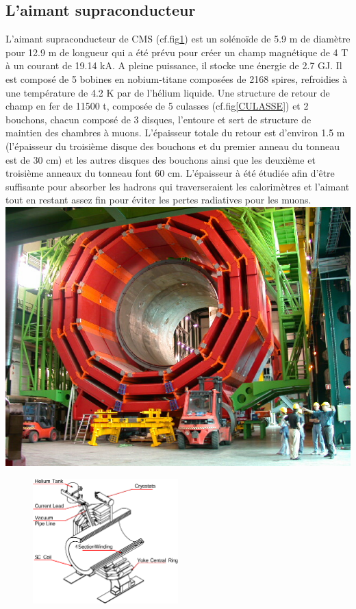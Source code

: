 \subsection{L'aimant supraconducteur}
L'aimant supraconducteur de CMS (cf.fig\ref{MAGNET}) est un solénoïde de 5.9 m de diamètre pour 12.9 m de longueur qui a été prévu pour créer un champ magnétique de 4 T à un courant de 19.14 kA. A pleine puissance, il stocke une énergie de 2.7 GJ. Il est composé de 5 bobines en nobium-titane composées de 2168 spires, refroidies à une température de 4.2 K par de l'hélium liquide. Une structure de retour de champ en fer de 11500 t, composée de 5 culasses (cf.fig\ref{CULASSE}) et 2 bouchons, chacun composé de 3 disques, l'entoure et sert de structure de maintien des chambres à muons. L'épaisseur totale du retour est d'environ 1.5 m (l'épaisseur du troisième disque des bouchons et du premier anneau du tonneau est de 30 cm) et les autres disques des bouchons ainsi que les deuxième et troisième anneaux du tonneau font 60 cm. L'épaisseur à été étudiée afin d'être suffisante pour absorber les hadrons qui traverseraient les calorimètres et l'aimant tout en restant assez fin pour éviter les pertes radiatives pour les muons.
\marginpar
{
	\centering
	\includegraphics[width=\marginparwidth]{CMS/CULASSE.jpg}
	\label{CULASSE}
}
\begin{figure}[ht!]
	\centering
	\includegraphics[width=0.50\textwidth]{CMS/MAGNET.png}
	\label{MAGNET}
\end{figure}
